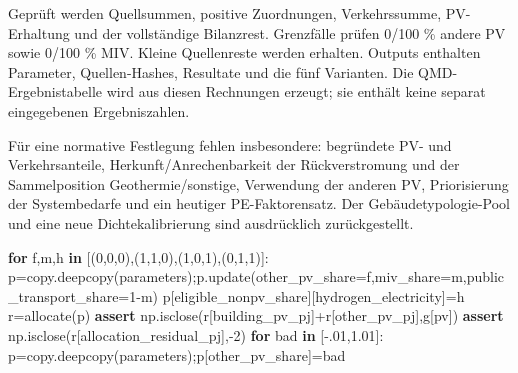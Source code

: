 \documentclass[
  ngerman,
  a4paper,
  DIV=11]{scrreprt}
\newenvironment{Shaded}{\begin{snugshade}}{\end{snugshade}}
\newcommand{\ControlFlowTok}[1]{\textcolor[rgb]{0.00,0.23,0.31}{\textbf{#1}}}
\newcommand{\DecValTok}[1]{\textcolor[rgb]{0.68,0.00,0.00}{#1}}
\newcommand{\FloatTok}[1]{\textcolor[rgb]{0.68,0.00,0.00}{#1}}
\newcommand{\KeywordTok}[1]{\textcolor[rgb]{0.00,0.23,0.31}{\textbf{#1}}}
\newcommand{\NormalTok}[1]{\textcolor[rgb]{0.00,0.23,0.31}{#1}}
\newcommand{\OperatorTok}[1]{\textcolor[rgb]{0.37,0.37,0.37}{#1}}
\newcommand{\StringTok}[1]{\textcolor[rgb]{0.13,0.47,0.30}{#1}}
\begin{document}
Geprüft werden Quellsummen, positive Zuordnungen, Verkehrssumme,
PV-Erhaltung und der vollständige Bilanzrest. Grenzfälle prüfen 0/100 \%
andere PV sowie 0/100 \% MIV. Kleine Quellenreste werden erhalten.
Outputs enthalten Parameter, Quellen-Hashes, Resultate und die fünf
Varianten. Die QMD-Ergebnistabelle wird aus diesen Rechnungen erzeugt;
sie enthält keine separat eingegebenen Ergebniszahlen.

Für eine normative Festlegung fehlen insbesondere: begründete PV- und
Verkehrsanteile, Herkunft/Anrechenbarkeit der Rückverstromung und der
Sammelposition Geothermie/sonstige, Verwendung der anderen PV,
Priorisierung der Systembedarfe und ein heutiger PE-Faktorensatz. Der
Gebäudetypologie-Pool und eine neue Dichtekalibrierung sind ausdrücklich
zurückgestellt.

\begin{Shaded}
\begin{Highlighting}[]
\ControlFlowTok{for}\NormalTok{ f,m,h }\KeywordTok{in}\NormalTok{ [(}\DecValTok{0}\NormalTok{,}\DecValTok{0}\NormalTok{,}\DecValTok{0}\NormalTok{),(}\DecValTok{1}\NormalTok{,}\DecValTok{1}\NormalTok{,}\DecValTok{0}\NormalTok{),(}\DecValTok{1}\NormalTok{,}\DecValTok{0}\NormalTok{,}\DecValTok{1}\NormalTok{),(}\DecValTok{0}\NormalTok{,}\DecValTok{1}\NormalTok{,}\DecValTok{1}\NormalTok{)]:}
\NormalTok{    p}\OperatorTok{=}\NormalTok{copy.deepcopy(parameters)}\OperatorTok{;}\NormalTok{p.update(other\_pv\_share}\OperatorTok{=}\NormalTok{f,miv\_share}\OperatorTok{=}\NormalTok{m,public\_transport\_share}\OperatorTok{=}\DecValTok{1}\OperatorTok{{-}}\NormalTok{m)}
\NormalTok{    p[}\StringTok{\textquotesingle{}eligible\_nonpv\_share\textquotesingle{}}\NormalTok{][}\StringTok{\textquotesingle{}hydrogen\_electricity\textquotesingle{}}\NormalTok{]}\OperatorTok{=}\NormalTok{h}
\NormalTok{    r}\OperatorTok{=}\NormalTok{allocate(p)}
    \ControlFlowTok{assert}\NormalTok{ np.isclose(r[}\StringTok{\textquotesingle{}building\_pv\_pj\textquotesingle{}}\NormalTok{]}\OperatorTok{+}\NormalTok{r[}\StringTok{\textquotesingle{}other\_pv\_pj\textquotesingle{}}\NormalTok{],g[}\StringTok{\textquotesingle{}pv\textquotesingle{}}\NormalTok{])}
    \ControlFlowTok{assert}\NormalTok{ np.isclose(r[}\StringTok{\textquotesingle{}allocation\_residual\_pj\textquotesingle{}}\NormalTok{],}\OperatorTok{{-}}\DecValTok{2}\NormalTok{)}
\ControlFlowTok{for}\NormalTok{ bad }\KeywordTok{in}\NormalTok{ [}\OperatorTok{{-}}\FloatTok{.01}\NormalTok{,}\FloatTok{1.01}\NormalTok{]:}
\NormalTok{    p}\OperatorTok{=}\NormalTok{copy.deepcopy(parameters)}\OperatorTok{;}\NormalTok{p[}\StringTok{\textquotesingle{}other\_pv\_share\textquotesingle{}}\NormalTok{]}\OperatorTok{=}\NormalTok{bad}

\end{Highlighting}
\end{Shaded}
\end{document}
